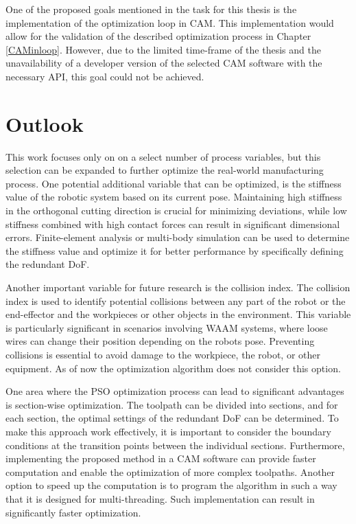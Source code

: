 One of the proposed goals mentioned in the task for this thesis is the implementation of the optimization loop in \acrshort{CAM}. This implementation would allow for the validation of the described optimization process in Chapter \ref{CAMinloop}. However, due to the limited time-frame of the thesis and the unavailability of a developer version of the selected \acrshort{CAM} software with the necessary \acrshort{API}, this goal could not be achieved.


\section{Outlook}\label{Outlook}

This work focuses only on on a select number of process variables, but this selection can be expanded to further optimize the real-world manufacturing process. One potential additional variable that can be optimized, is the stiffness value of the robotic system based on its current pose. Maintaining high stiffness in the orthogonal cutting direction is crucial for minimizing deviations, while low stiffness combined with high contact forces can result in significant dimensional errors. Finite-element analysis or multi-body simulation can be used to determine the stiffness value and optimize it for better performance by specifically defining the redundant \acrshort{DoF}.

Another important variable for future research is the collision index. The collision index is used to identify potential collisions between any part of the robot or the end-effector and the workpieces or other objects in the environment. This variable is particularly significant in scenarios involving \acrshort{WAAM} systems, where loose wires can change their position depending on the robots pose. Preventing collisions is essential to avoid damage to the workpiece, the robot, or other equipment. As of now the optimization algorithm does not consider this option.

One area where the \acrshort{PSO} optimization process can lead to significant advantages is section-wise optimization. The toolpath can be divided into sections, and for each section, the optimal settings of the redundant \acrshort{DoF} can be determined. To make this approach work effectively, it is important to consider the boundary conditions at the transition points between the individual sections.
Furthermore, implementing the proposed method in a \acrshort{CAM} software can provide faster computation and enable the optimization of more complex toolpaths. Another option to speed up the computation is to program the algorithm in such a way that it is designed for multi-threading. Such implementation can result in significantly faster optimization.  

